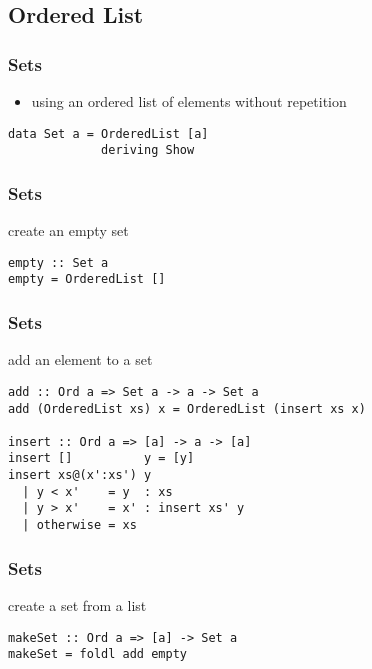 \documentclass[dvipsnames]{beamer}
\theoremstyle{plain}
\begin{document}
\subsection{Ordered List}

\begin{frame}[fragile]
  \frametitle{Sets}

  \begin{itemize}
    \item using an ordered list of elements without repetition
  \end{itemize}

  \begin{exampleblock}{}
    \begin{lstlisting}
data Set a = OrderedList [a]
             deriving Show
    \end{lstlisting}
  \end{exampleblock}
\end{frame}

\begin{frame}[fragile]
  \frametitle{Sets}

  \begin{exampleblock}{create an empty set}
    \begin{lstlisting}
empty :: Set a
empty = OrderedList []
    \end{lstlisting}
  \end{exampleblock}
\end{frame}

\begin{frame}[fragile]
  \frametitle{Sets}

  \begin{exampleblock}{add an element to a set}
    \begin{lstlisting}[deletekeywords={insert}]
add :: Ord a => Set a -> a -> Set a
add (OrderedList xs) x = OrderedList (insert xs x)

insert :: Ord a => [a] -> a -> [a]
insert []          y = [y]
insert xs@(x':xs') y
  | y < x'    = y  : xs
  | y > x'    = x' : insert xs' y
  | otherwise = xs
    \end{lstlisting}
  \end{exampleblock}
\end{frame}

\begin{frame}[fragile]
  \frametitle{Sets}

  \begin{exampleblock}{create a set from a list}
    \begin{lstlisting}
makeSet :: Ord a => [a] -> Set a
makeSet = foldl add empty
    \end{lstlisting}
  \end{exampleblock}
\end{frame}
\end{document}
